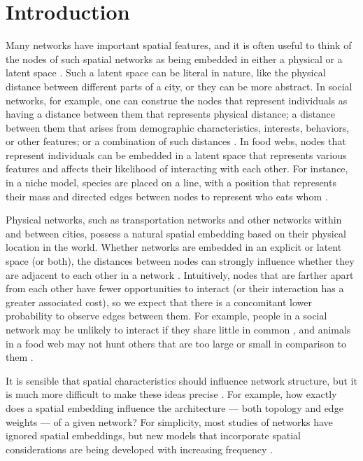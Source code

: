 \documentclass[%
 reprint,
 amsmath,amssymb,
 aps,
]{revtex4-1}
\begin{document}


\section{Introduction} \label{sec:introduction}

Many networks have important spatial features, and it is often useful to think of the nodes of such spatial networks as being embedded in either a physical or a latent space \cite{barthelemy,newman2018}. Such a latent space can be literal in nature, like the physical distance between different parts of a city, or they can be more abstract. In social networks, for example, one can construe the nodes that represent individuals as having a distance between them that represents physical distance; a distance between them that arises from demographic characteristics, interests, behaviors, or other features; or a combination of such distances \cite{social}. In food webs, nodes that represent individuals can be embedded in a latent 
space that represents various
 features and affects their likelihood of interacting with each other. 
For instance, in a niche model, species are placed on a line, with a position that represents their mass and directed edges between nodes to represent who eats whom \cite{foodwebs}.
 
Physical networks, such as transportation networks and other networks within and between cities, possess a natural spatial embedding based on their physical location in the world. Whether networks are embedded in an explicit or latent space (or both), the distances between nodes can strongly influence whether they are adjacent to each other in a network \cite{spatial1, air-traffic, routelengthstatistic}. Intuitively, nodes that are farther apart from each other have fewer opportunities to interact (or their interaction has a greater associated cost), so we expect that there is a concomitant lower probability to observe edges between them. For example, people in a social network may be unlikely to interact if they share little in common \cite{socialdistance}, and animals in a food web may not hunt others that are too large or small in comparison to them \cite{foodwebs}. 

It is sensible that spatial characteristics should influence network structure, but it is much more difficult to make these ideas precise \cite{barthelemy}. For example, how exactly does a spatial embedding influence the architecture --- both topology and edge weights --- of a given network? For simplicity, most studies of networks have ignored spatial embeddings, but new models that incorporate spatial considerations are being developed with increasing frequency \cite{barthelemy}. 
\end{document}
